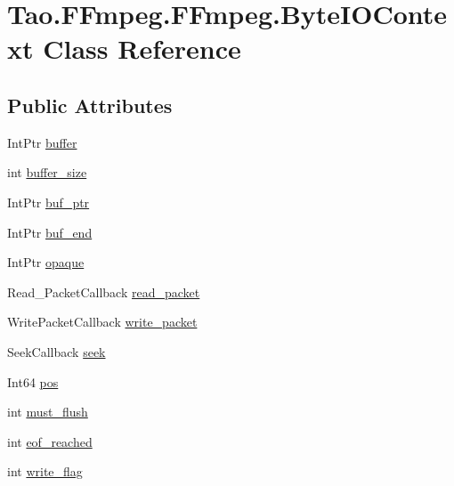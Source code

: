 \hypertarget{class_tao_1_1_f_fmpeg_1_1_f_fmpeg_1_1_byte_i_o_context}{
\section{Tao.FFmpeg.FFmpeg.ByteIOContext Class Reference}
\label{class_tao_1_1_f_fmpeg_1_1_f_fmpeg_1_1_byte_i_o_context}
}
\subsection*{Public Attributes}
\begin{DoxyCompactItemize}
\item 
IntPtr \hyperlink{class_tao_1_1_f_fmpeg_1_1_f_fmpeg_1_1_byte_i_o_context_a1431f9060a50988616cd078b071bd61d}{buffer}
\item 
int \hyperlink{class_tao_1_1_f_fmpeg_1_1_f_fmpeg_1_1_byte_i_o_context_ada34187e9cbfa3c63ba9dccfb06761b4}{buffer\_\-size}
\item 
IntPtr \hyperlink{class_tao_1_1_f_fmpeg_1_1_f_fmpeg_1_1_byte_i_o_context_a91db8508fd8865649eeb5fa08ee685d3}{buf\_\-ptr}
\item 
IntPtr \hyperlink{class_tao_1_1_f_fmpeg_1_1_f_fmpeg_1_1_byte_i_o_context_a2bca3fd7bdf74174fb57b2d5fbfb3c5e}{buf\_\-end}
\item 
IntPtr \hyperlink{class_tao_1_1_f_fmpeg_1_1_f_fmpeg_1_1_byte_i_o_context_a48bf14387c3939aaf725d40b1353ba04}{opaque}
\item 
Read\_\-PacketCallback \hyperlink{class_tao_1_1_f_fmpeg_1_1_f_fmpeg_1_1_byte_i_o_context_ad6a4669fed098c65b49a9b4f98f97d0a}{read\_\-packet}
\item 
WritePacketCallback \hyperlink{class_tao_1_1_f_fmpeg_1_1_f_fmpeg_1_1_byte_i_o_context_a5d96beca7cf0b2da657f00a636ae8877}{write\_\-packet}
\item 
SeekCallback \hyperlink{class_tao_1_1_f_fmpeg_1_1_f_fmpeg_1_1_byte_i_o_context_a6baa670a309b475a4358641521059c40}{seek}
\item 
Int64 \hyperlink{class_tao_1_1_f_fmpeg_1_1_f_fmpeg_1_1_byte_i_o_context_a7c6dd2fe7dabf3f8984bd1a894284c0b}{pos}
\item 
int \hyperlink{class_tao_1_1_f_fmpeg_1_1_f_fmpeg_1_1_byte_i_o_context_a2387de088221caeda5049871f6301584}{must\_\-flush}
\item 
int \hyperlink{class_tao_1_1_f_fmpeg_1_1_f_fmpeg_1_1_byte_i_o_context_acafbb5911c6f88d90db5501aad830953}{eof\_\-reached}
\item 
int \hyperlink{class_tao_1_1_f_fmpeg_1_1_f_fmpeg_1_1_byte_i_o_context_a36b5aeaaec0b33b20e62fe68c149a310}{write\_\-flag}

\end{DoxyCompactItemize}
